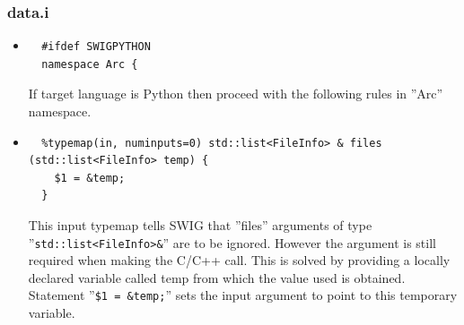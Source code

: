 \documentclass{article}
\begin{document}
\subsubsection{data.i}
\label{idata}
\begin{flushleft}
\begin{itemize}
  \item{ \begin{verbatim}
  #ifdef SWIGPYTHON
  namespace Arc {
  \end{verbatim}
  If target language is Python then proceed with the following rules in ''Arc'' namespace.
  }
\end{itemize}
\begin{itemize}
  \item{ \begin{verbatim}
  %typemap(in, numinputs=0) std::list<FileInfo> & files (std::list<FileInfo> temp) {
    $1 = &temp;
  }
  \end{verbatim}
  This input typemap tells SWIG that ''files'' arguments of type ''\verb$std::list<FileInfo>&$''
  are to be ignored. However the argument is still required when making the C/C++ call. 
  This is solved by providing a locally declared variable called temp from which the value 
  used is obtained. Statement ''\verb#$1 = &temp;#'' sets the input argument to point to this temporary variable.

}
\end{itemize}
\end{flushleft}
\end{document}
